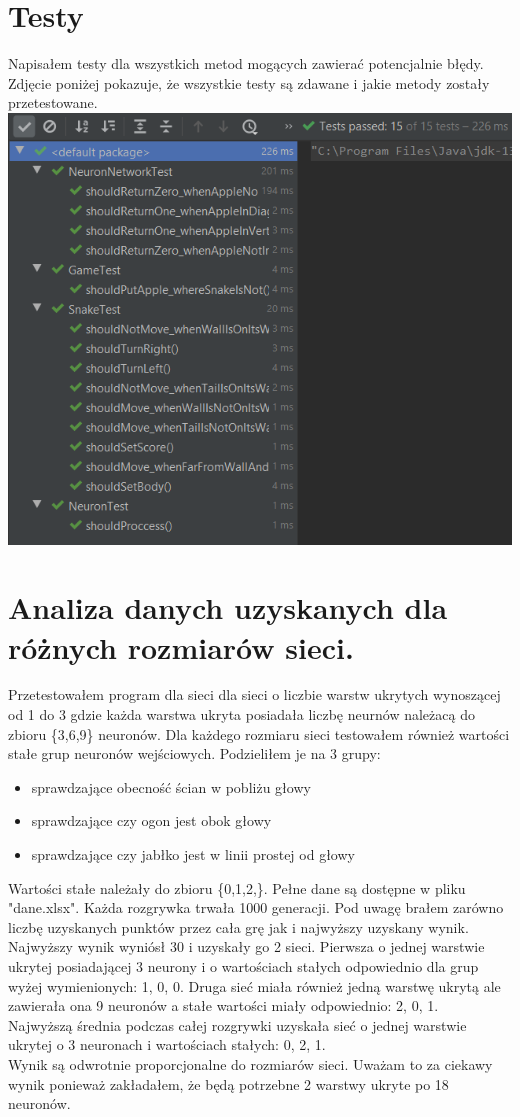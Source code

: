 \documentclass{article}
\begin{document}
\section{Testy}
    Napisałem testy dla wszystkich metod mogących zawierać potencjalnie błędy. Zdjęcie poniżej pokazuje, że wszystkie testy są zdawane i jakie metody zostały przetestowane.
    \\ \includegraphics[scale = 2]{testy}
\section{Analiza danych uzyskanych dla różnych rozmiarów sieci.}
    Przetestowałem program dla sieci dla sieci o liczbie warstw ukrytych wynoszącej od 1 do 3 gdzie każda warstwa ukryta posiadała liczbę neurnów należacą do zbioru \{3,6,9\} neuronów. Dla każdego rozmiaru sieci testowałem również wartości stałe grup neuronów wejściowych. Podzieliłem je na 3 grupy:
    \begin{itemize}
        \item sprawdzające obecność ścian w pobliżu głowy
        \item sprawdzające czy ogon jest obok głowy
        \item sprawdzające czy jabłko jest w linii prostej od głowy
    \end{itemize}
    Wartości stałe należały do zbioru \{0,1,2,\}. Pełne dane są dostępne w pliku "dane.xlsx". Każda rozgrywka trwała 1000 generacji. Pod uwagę brałem zarówno liczbę uzyskanych punktów przez cała grę jak i najwyższy uzyskany wynik. Najwyższy wynik wyniósł 30 i uzyskały go 2 sieci. Pierwsza o jednej warstwie ukrytej posiadającej 3 neurony i o wartościach stałych odpowiednio dla grup wyżej wymienionych: 1, 0, 0. Druga sieć miała również jedną warstwę ukrytą ale zawierała ona 9 neuronów a stałe wartości miały odpowiednio: 2, 0, 1. \\
    Najwyższą średnia podczas całej rozgrywki uzyskała sieć o jednej warstwie ukrytej o 3 neuronach i wartościach stałych: 0, 2, 1.
    \\
    Wynik są odwrotnie proporcjonalne do rozmiarów sieci. Uważam to za ciekawy wynik ponieważ zakładałem, że będą potrzebne 2 warstwy ukryte po 18 neuronów.
\newpage
\end{document}
